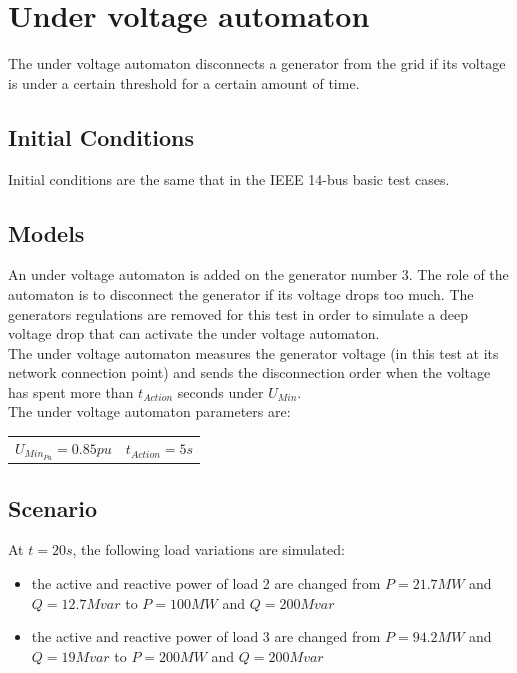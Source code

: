 \documentclass[a4paper, 12pt]{report}
\begin{document}
\newpage
\section{Under voltage automaton}
\label{UnderVoltageAutomaton}

The under voltage automaton disconnects a generator from the grid if its voltage is under a certain threshold for a certain amount of time.

\subsection{Initial Conditions}

Initial conditions are the same that in the IEEE 14-bus basic test cases.

\subsection{Models}

An under voltage automaton is added on the generator number 3. The role of the automaton is to disconnect the generator if its voltage drops too much. The generators regulations are removed for this test in order to simulate a deep voltage drop that can activate the under voltage automaton.\\

The under voltage automaton measures the generator voltage (in this test at its network connection point) and sends the disconnection order when the voltage has spent more than $t_{Action}$ seconds under $U_{Min}$.\\

The under voltage automaton parameters are:
\begin{center}
\begin{tabular}{l|l}
   $U_{Min_{Pu}}=0.85pu$ & $t_{Action}=5s$  \\
\end{tabular}
\end{center}

\subsection{Scenario}
At $t=20s$, the following load variations are simulated:
\begin{itemize}
\item{the active and reactive power of load 2 are changed from $P=21.7MW$ and $Q=12.7Mvar$ to $P=100MW$ and $Q=200Mvar$}
\item{the active and reactive power of load 3 are changed from $P=94.2MW$ and $Q=19Mvar$ to $P=200MW$ and $Q=200Mvar$}
\end{itemize}
\end{document}
